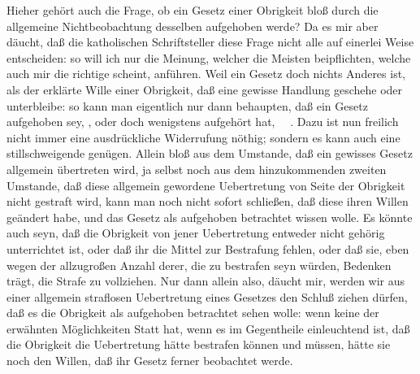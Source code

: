 \begin{RWanm} 
Hieher gehört auch die Frage, ob ein Gesetz einer Obrigkeit bloß durch die allgemeine Nichtbeobachtung desselben aufgehoben werde? Da es mir aber däucht, daß die katholischen Schriftsteller diese Frage nicht alle auf einerlei Weise entscheiden: so will ich nur die Meinung, welcher die Meisten beipflichten, welche auch mir die richtige scheint, anführen. Weil ein Gesetz doch nichts Anderes ist, als der erklärte Wille einer Obrigkeit, daß eine gewisse Handlung geschehe oder unterbleibe: so kann man eigentlich nur dann behaupten, daß ein Gesetz aufgehoben sey, , oder doch wenigstens aufgehört hat, ~\ . Dazu ist nun freilich nicht immer eine ausdrückliche Widerrufung nöthig; sondern es kann auch eine stillschweigende genügen. Allein bloß aus dem Umstande, daß ein gewisses Gesetz allgemein übertreten wird, ja selbst noch aus dem hinzukommenden zweiten Umstande, daß diese allgemein gewordene Uebertretung von Seite der Obrigkeit nicht gestraft wird, kann man noch nicht sofort schließen, daß diese ihren Willen geändert habe, und das Gesetz als aufgehoben betrachtet wissen wolle. Es könnte auch seyn, daß die Obrigkeit von jener Uebertretung entweder nicht gehörig unterrichtet ist, oder daß ihr die Mittel zur Bestrafung fehlen, oder daß sie, eben wegen der allzugroßen Anzahl derer, die zu bestrafen seyn würden, Bedenken trägt, die Strafe zu vollziehen. Nur dann allein also, däucht mir, werden wir aus einer allgemein straflosen Uebertretung eines Gesetzes den Schluß ziehen dürfen, daß es die Obrigkeit als aufgehoben betrachtet sehen wolle: wenn keine der erwähnten Möglichkeiten Statt hat, wenn es im Gegentheile einleuchtend ist, daß die Obrigkeit die Uebertretung hätte bestrafen können und müssen, hätte sie noch den Willen, daß ihr Gesetz ferner beobachtet werde. \end{RWanm}

